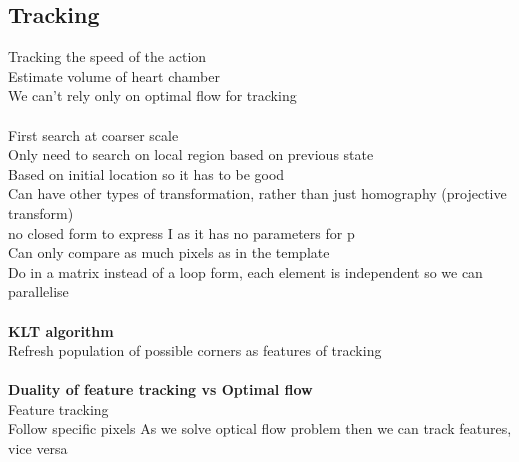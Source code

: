 \documentclass[11pt]{article}
\begin{document}
\subsection*{Tracking}
Tracking the speed of the action\\
Estimate volume of heart chamber\\
We can't rely only on optimal flow for tracking\\
\\
First search at coarser scale\\
Only need to search on local region based on previous state
\\
Based on initial location so it has to be good
\\
Can have other types of transformation, rather than just homography (projective transform)
\\
no closed form to express I as it has no parameters for p	\\
Can only compare as much pixels as in the template
\\
Do in a matrix instead of a loop form, each element is independent so we can parallelise
\\\\
\textbf{KLT algorithm}\\
Refresh population of possible corners as features of tracking\\\\
\textbf{Duality of feature tracking vs Optimal flow}\\
Feature tracking\\
Follow specific pixels
As we solve optical flow problem then we can track features, vice versa\\
\end{document}
